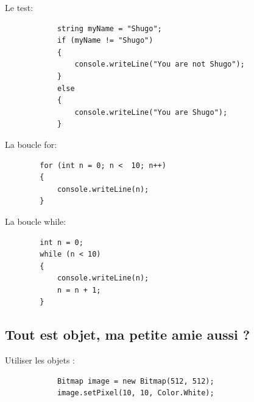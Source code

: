 \documentclass{beamer}
\begin{document}
\begin{frame}[fragile]
Le test:
		\begin{lstlisting}
			string myName = "Shugo";
			if (myName != "Shugo")
			{
 				console.writeLine("You are not Shugo");
			}
			else
			{
 				console.writeLine("You are Shugo");
			}
		\end{lstlisting}

\end{frame}

\begin{frame}[fragile]
La boucle for:
		\begin{lstlisting}
		for (int n = 0; n <  10; n++)
		{
 			console.writeLine(n);
		}
		\end{lstlisting}
\end{frame}

\begin{frame}[fragile]
La boucle while:
		\begin{lstlisting}
		int n = 0;
		while (n < 10)
		{
 			console.writeLine(n);
 			n = n + 1;
		}
		\end{lstlisting}
\end{frame}


\subsection{Tout est objet,  ma petite amie aussi ?}
\begin{frame}[fragile]
Utiliser les objets :
	\begin{center}
		\begin{lstlisting}
			Bitmap image = new Bitmap(512, 512);
			image.setPixel(10, 10, Color.White);
		\end{lstlisting}
	\end{center}
\end{frame}
\end{document}
